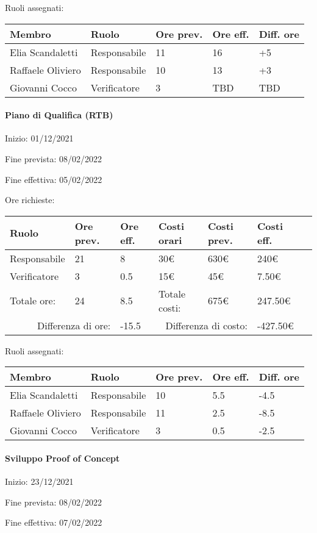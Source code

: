 \documentclass[a4paper, 12pt]{article}
\begin{document}
Ruoli assegnati:\\[0.5em]
\begin{tabular}{|l|l|l|l|l|}\hline
Membro & Ruolo & Ore prev. & Ore eff. & Diff. ore \\\hline
Elia Scandaletti & Responsabile & 11 & 16 & +5 \\\hline
Raffaele Oliviero & Responsabile & 10 & 13 & +3 \\\hline
Giovanni Cocco & Verificatore & 3 & TBD & TBD \\\hline
\end{tabular}

\paragraph{Piano di Qualifica (RTB)}
Inizio: 01/12/2021\par
Fine prevista: 08/02/2022\par
Fine effettiva: 05/02/2022

Ore richieste:\\[0.5em]
\begin{tabular}{|l|l|l||l|l|l|l|}\hline
Ruolo & Ore prev. & Ore eff. & Costi orari & Costi prev. & Costi eff.\\\hline
Responsabile & 21 & 8 & 30\euro & 630\euro & 240\euro \\\hline
Verificatore & 3 & 0.5 & 15\euro & 45\euro & 7.50\euro \\\hline
Totale ore: & 24 & 8.5 & Totale costi: & 675\euro & 247.50\euro \\\hline
\multicolumn{2}{|r|}{Differenza di ore:} & -15.5 & \multicolumn{2}{r|}{Differenza di costo:} & -427.50\euro \\\hline
\end{tabular}

Ruoli assegnati:\\[0.5em]
\begin{tabular}{|l|l|l|l|l|}\hline
Membro & Ruolo & Ore prev. & Ore eff. & Diff. ore \\\hline
Elia Scandaletti & Responsabile & 10 & 5.5 & -4.5 \\\hline
Raffaele Oliviero & Responsabile & 11 & 2.5 & -8.5 \\\hline
Giovanni Cocco & Verificatore & 3 & 0.5 & -2.5 \\\hline
\end{tabular}

\paragraph{Sviluppo Proof of Concept}
Inizio: 23/12/2021\par
Fine prevista: 08/02/2022\par
Fine effettiva: 07/02/2022
\end{document}
